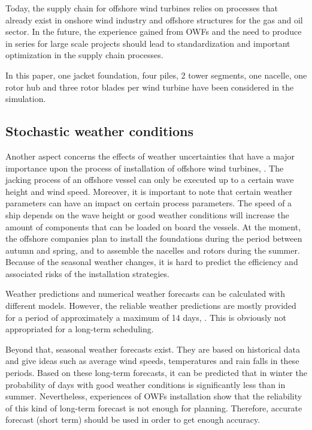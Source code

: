Today, the supply chain for offshore wind turbines relies on processes that already exist in onshore wind industry and offshore structures for the gas and oil sector. In the future, the experience gained from OWFs and the need to produce in series for large scale projects should lead to standardization and important optimization in the supply chain processes.


In this paper, one jacket foundation, four piles, 2 tower segments, one nacelle, one rotor hub and three rotor blades per wind turbine have been considered in the simulation.

\subsection{Stochastic weather conditions}
Another aspect concerns the effects of weather uncertainties that have a major importance upon the process of installation of offshore wind turbines, \cite{COMPIT11}. The jacking process of an offshore vessel can only be executed up to a certain wave height and wind speed. Moreover, it is important to note that certain weather parameters can have an impact on certain process parameters. The speed of a ship depends on the wave height or good weather conditions will increase the amount of components that can be loaded on board the vessels. At the moment, the offshore companies plan to install the foundations during the period between autumn and spring, and to assemble the nacelles and rotors during the summer. Because of the seasonal weather changes, it is hard to predict the efficiency and associated risks of the installation strategies.

Weather predictions and numerical weather forecasts can be calculated with different models. However, the reliable weather predictions are mostly provided for a period of approximately a maximum of 14 days, \cite{hinnenthal2007}. This is obviously not appropriated for a long-term scheduling.

Beyond that, seasonal weather forecasts exist. They are based on historical data and give ideas such as average wind speeds, temperatures and rain falls in these periods. Based on these long-term forecasts, it can be predicted that in winter the probability of days with good weather conditions is significantly less than in summer. Nevertheless, experiences of OWFs installation show that the reliability of this kind of long-term forecast is not enough for planning. Therefore, accurate forecast (short term) should be used in order to get enough accuracy.

